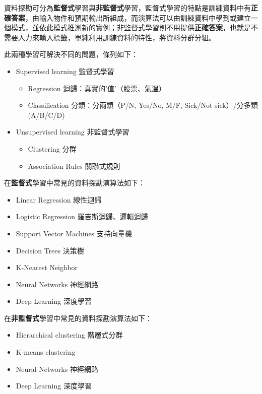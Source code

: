 \documentclass[
]{book}
\providecommand{\tightlist}{%
  \setlength{\itemsep}{0pt}\setlength{\parskip}{0pt}}
\begin{document}
資料探勘可分為\textbf{監督式}學習與\textbf{非監督式}學習，監督式學習的特點是訓練資料中有\textbf{正確答案}，由輸入物件和預期輸出所組成，而演算法可以由訓練資料中學到或建立一個模式，並依此模式推測新的實例；非監督式學習則不用提供\textbf{正確答案}，也就是不需要人力來輸入標籤，單純利用訓練資料的特性，將資料分群分組。

此兩種學習可解決不同的問題，條列如下：

\begin{itemize}
\tightlist
\item
  Supervised learning 監督式學習

  \begin{itemize}
  \tightlist
  \item
    Regression 迴歸：真實的'值'（股票、氣溫）
  \item
    Classification 分類：分兩類（P/N, Yes/No, M/F, Sick/Not sick）/分多類 (A/B/C/D)
  \end{itemize}
\item
  Unsupervised learning 非監督式學習

  \begin{itemize}
  \tightlist
  \item
    Clustering 分群
  \item
    Association Rules 關聯式規則
  \end{itemize}
\end{itemize}

在\textbf{監督式}學習中常見的資料探勘演算法如下：

\begin{itemize}
\tightlist
\item
  Linear Regression 線性迴歸
\item
  Logistic Regression 羅吉斯迴歸、邏輯迴歸
\item
  Support Vector Machines 支持向量機
\item
  Decision Trees 決策樹
\item
  K-Nearest Neighbor
\item
  Neural Networks 神經網路
\item
  Deep Learning 深度學習
\end{itemize}

在\textbf{非監督式}學習中常見的資料探勘演算法如下：

\begin{itemize}
\tightlist
\item
  Hierarchical clustering 階層式分群
\item
  K-means clustering
\item
  Neural Networks 神經網路
\item
  Deep Learning 深度學習
\end{itemize}
\end{document}

